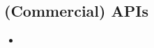   



\subsection{(Commercial) APIs}



\begin{frame}{}
  \begin{itemize}
  \item 
  \end{itemize}
\end{frame}



